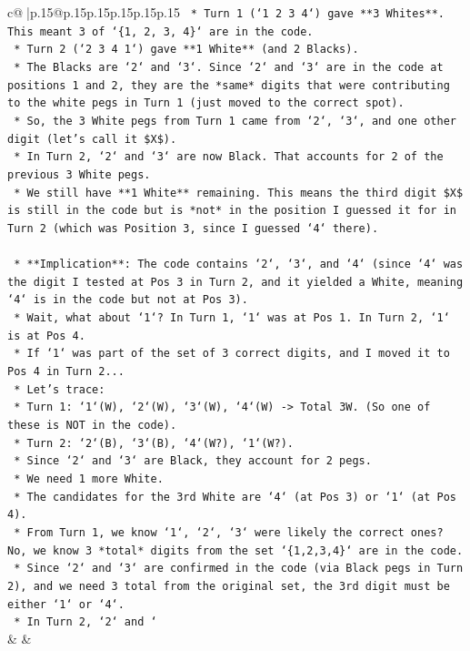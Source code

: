 \documentclass{article}
\begin{document}
{\begin{supertabular}{c@{$\;$}|p{.15\linewidth}@{}p{.15\linewidth}p{.15\linewidth}p{.15\linewidth}p{.15\linewidth}p{.15\linewidth}}
{{{\texttt{    *   Turn 1 (`1 2 3 4`) gave **3 Whites**. This meant 3 of `\{1, 2, 3, 4\}` are in the code.} \\
\texttt{    *   Turn 2 (`2 3 4 1`) gave **1 White** (and 2 Blacks).} \\
\texttt{    *   The Blacks are `2` and `3`. Since `2` and `3` are in the code at positions 1 and 2, they are the *same* digits that were contributing to the white pegs in Turn 1 (just moved to the correct spot).} \\
\texttt{    *   So, the 3 White pegs from Turn 1 came from `2`, `3`, and one other digit (let's call it \$X\$).} \\
\texttt{    *   In Turn 2, `2` and `3` are now Black. That accounts for 2 of the previous 3 White pegs.} \\
\texttt{    *   We still have **1 White** remaining. This means the third digit \$X\$ is still in the code but is *not* in the position I guessed it for in Turn 2 (which was Position 3, since I guessed `4` there).} \\
\\ 
\texttt{    *   **Implication**: The code contains `2`, `3`, and `4` (since `4` was the digit I tested at Pos 3 in Turn 2, and it yielded a White, meaning `4` is in the code but not at Pos 3).} \\
\texttt{    *   Wait, what about `1`? In Turn 1, `1` was at Pos 1. In Turn 2, `1` is at Pos 4.} \\
\texttt{    *   If `1` was part of the set of 3 correct digits, and I moved it to Pos 4 in Turn 2...} \\
\texttt{    *   Let's trace:} \\
\texttt{        *   Turn 1: `1`(W), `2`(W), `3`(W), `4`(W) {-}> Total 3W. (So one of these is NOT in the code).} \\
\texttt{        *   Turn 2: `2`(B), `3`(B), `4`(W?), `1`(W?).} \\
\texttt{        *   Since `2` and `3` are Black, they account for 2 pegs.} \\
\texttt{        *   We need 1 more White.} \\
\texttt{        *   The candidates for the 3rd White are `4` (at Pos 3) or `1` (at Pos 4).} \\
\texttt{        *   From Turn 1, we know `1`, `2`, `3` were likely the correct ones? No, we know 3 *total* digits from the set `\{1,2,3,4\}` are in the code.} \\
\texttt{        *   Since `2` and `3` are confirmed in the code (via Black pegs in Turn 2), and we need 3 total from the original set, the 3rd digit must be either `1` or `4`.} \\
\texttt{        *   In Turn 2, `2` and `} \\
            }
        }
    }
    & & \\ \\


\end{supertabular}}
\end{document}
